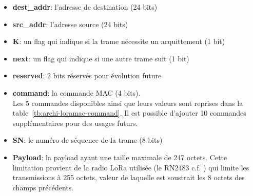     \begin{itemize}
        \item \textbf{dest\_addr}: l'adresse de destination (24 bits)
        \item \textbf{src\_addr}: l'adresse source (24 bits)
        \item \textbf{K}: un flag  qui indique si la trame nécessite un acquittement (1 bit)
        \item \textbf{next}: un flag qui indique si une autre trame suit (1 bit)
        \item \textbf{reserved}: 2 bits réservés pour évolution future
        \item \textbf{command}: la commande MAC (4 bits).\\
        Les 5 commandes disponibles ainsi que leurs valeurs sont reprises dans la table~\ref{tb:archi-loramac-command}. Il est possible d'ajouter 10 commandes supplémentaires pour des usages futurs.
        \item \textbf{SN}: le numéro de séquence de la trame (8 bits)
        \item \textbf{Payload}: la payload ayant une taille maximale de 247 octets. Cette limitation provient de la radio LoRa utilisée (le RN2483 c.f. ) qui limite les transmissions à 255 octets, valeur de laquelle est soustrait les 8 octets des champs précédents.
        \begin{table}[H]
            \centering
            \caption{Description des commandes LoRaMAC.}
            \label{tb:archi-loramac-command}
        \end{table}
    \end{itemize}
